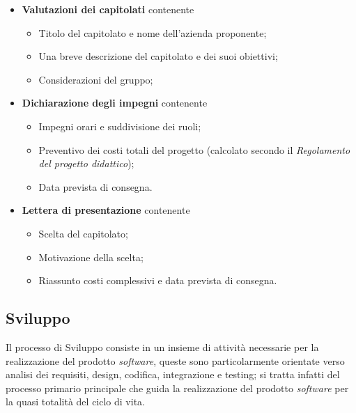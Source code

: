 \documentclass[10pt, letterpaper]{article}
\begin{document}
\begin{itemize}
    \item \textbf{Valutazioni dei capitolati} contenente
          \begin{itemize}
              \item Titolo del capitolato e nome dell'azienda proponente;
              \item Una breve descrizione del capitolato e dei suoi obiettivi;
              \item Considerazioni del gruppo;
          \end{itemize}
    \item \textbf{Dichiarazione degli impegni} contenente
          \begin{itemize}
              \item Impegni orari e suddivisione dei ruoli;
              \item Preventivo dei costi totali del progetto (calcolato secondo il \textit{Regolamento del progetto didattico});
              \item Data prevista di consegna.
          \end{itemize}
    \item \textbf{Lettera di presentazione} contenente
          \begin{itemize}
              \item Scelta del capitolato;
              \item Motivazione della scelta;
              \item Riassunto costi complessivi e data prevista di consegna.
          \end{itemize}
\end{itemize}

\subsection{Sviluppo}
Il processo di Sviluppo consiste in un insieme di attività necessarie per la realizzazione del prodotto \textit{software}, queste sono particolarmente
orientate verso analisi dei requisiti, design, codifica, integrazione e testing; si tratta infatti del processo primario principale che
guida la realizzazione del prodotto \textit{software} per la quasi totalità del ciclo di vita.
\end{document}
